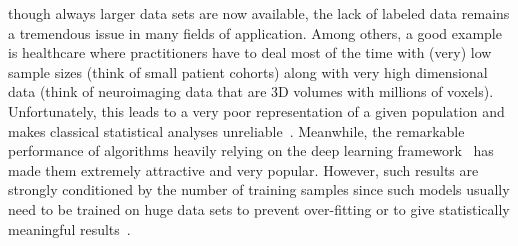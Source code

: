 \documentclass[10pt,journal,compsoc]{IEEEtran}
\begin{document}
% 
% 
% 
% 
 though always larger data sets are now available, the lack of labeled data remains a tremendous issue in many fields of application. Among others, a good example is healthcare where practitioners have to deal most of the time with (very) low sample sizes (think of small patient cohorts) along with very high dimensional data (think of neuroimaging data that are 3D volumes with millions of voxels). Unfortunately, this leads to a very poor representation of a given population and makes classical statistical analyses unreliable~\cite{button_power_2013,turner_small_2018}. Meanwhile, the remarkable performance of algorithms heavily relying on the deep learning framework~\cite{goodfellow_deep_2016} has made them extremely attractive and very popular. However, such results are strongly conditioned by the number of training samples since such models usually need to be trained on huge data sets to prevent over-fitting or to give statistically meaningful results~\cite{shorten_survey_2019}.
\end{document}
